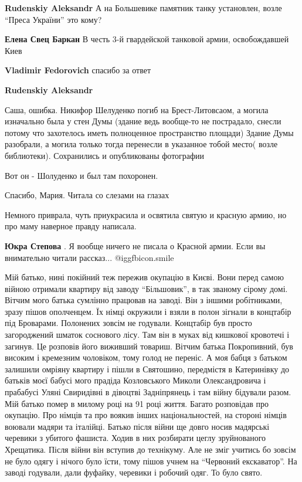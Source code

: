 \begin{itemize}
\begin{itemize}
\textbf{Rudenskiy Aleksandr} А на Большевике памятник танку установлен, возле \enquote{Преса України} это кому?

\textbf{Елена Свец Баркан} В честь 3-й гвардейской танковой армии, освобождавшей Киев

\textbf{Vladimir Fedorovich} спасибо за ответ

\textbf{Rudenskiy Aleksandr} 

Саша, ошибка. Никифор Шелуденко погиб на Брест-Литовсаом, а могила изначально
была у стен Думы (здание ведь вообще-то не пострадало, снесли потому что
захотелось иметь полноценное пространство площади) Здание Думы разобрали, а
могила только тогда перенесли в указанное тобой место( возле библиотеки).
Сохранились и опубликованы фотографии

Вот он - Шолуденко и был там похоронен.
\end{itemize} %

Спасибо, Мария. Читала со слезами на глазах

Немного приврала, чуть приукрасила и освятила святую и красную армию, но про маму наверное правду написала.

\textbf{Юкра Степова} . Я вообще ничего не писала о Красной армии. Если вы внимательно читали рассказ...  @igg{fbicon.smile} 


Мій батько, нині покійний теж пережив окупацію в Києві. Вони перед самою війною
отримали квартиру від заводу \enquote{Більшовик}, в так званому сірому домі. Вітчим
мого батька сумлінно працював на заводі. Він з іншими робітниками, зразу пішов
ополченцем. Їх німці окружили і взяли в полон зігнали в концтабір під
Броварами. Полонених зовсім не годували. Концтабір був просто загороджений
шматок соснового лісу. Там він в муках від кишкової кровотечі і загинув. Це
розповів його виживший товариш. Вітчим батька Покропивний, був високим і
кремезним чоловіком, тому голод не переніс. А моя бабця з батьком залишили
омріяну квартиру і пішли в Святошино, передмістя в Катеринівку до батьків моєї
бабусі мого прадіда Козловського Миколи Олександровича і прабабусі Уляні
Свиридівні в дівоцтві Задніпрянець і там війну бідували разом. Мій батько помер
в милому році на 91 році життя. Багато розповідав про окупацію. Про німців та
про воякив інших національностей, на стороні німців воювали мадяри та італійці.
Батько після війни ще довго носив мадярські черевики з убитого фашиста. Ходив в
них розбирати цеглу зруйнованого Хрещатика. Після війни він вступив до
технікуму. Але не зміг учитись бо зовсім не було одягу і нічого було їсти, тому
пішов учнем на \enquote{Червоний екскаватор}. На заводі годували, дали фуфайку,
черевики і робочий одяг. То було свято.


\end{itemize}

